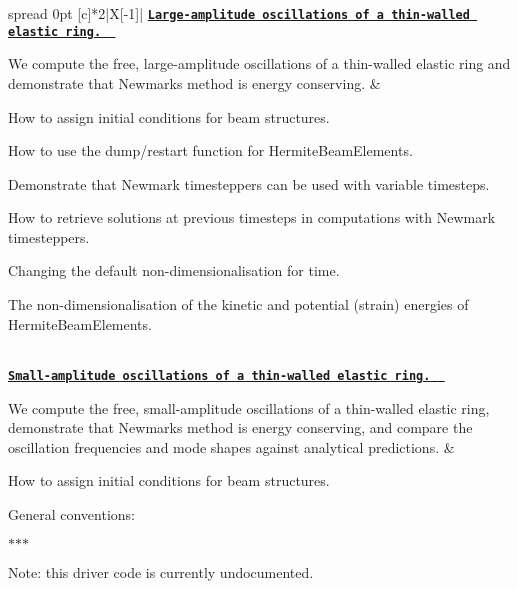 \tabulinesep=1mm
\begin{longtabu} spread 0pt [c]{*{2}{|X[-1]}|}
\hline
\href{../../beam/unsteady_ring/html/index.html}{\tt {\bfseries Large-\/amplitude oscillations of a thin-\/walled elastic ring. } }

We compute the free, large-\/amplitude oscillations of a thin-\/walled elastic ring and demonstrate that Newmark\textquotesingle{}s method is energy conserving.  &
\begin{DoxyItemize}
\item How to assign initial conditions for beam structures.
\item How to use the dump/restart function for {\ttfamily Hermite\+Beam\+Elements}.
\item Demonstrate that {\ttfamily Newmark} timesteppers can be used with variable timesteps.
\item How to retrieve solutions at previous timesteps in computations with {\ttfamily Newmark} timesteppers.
\item Changing the default non-\/dimensionalisation for time.
\item The non-\/dimensionalisation of the kinetic and potential (strain) energies of {\ttfamily Hermite\+Beam\+Elements}. 
\end{DoxyItemize}

\\
\href{../../beam/lin_unsteady_ring/html/index.html}{\tt {\bfseries Small-\/amplitude oscillations of a thin-\/walled elastic ring. } }

We compute the free, small-\/amplitude oscillations of a thin-\/walled elastic ring, demonstrate that Newmark\textquotesingle{}s method is energy conserving, and compare the oscillation frequencies and mode shapes against analytical predictions.  &
\begin{DoxyItemize}
\item How to assign initial conditions for beam structures.
\item General conventions\+:
\begin{DoxyItemize}
\item $\ast$$\ast$$\ast$
\end{DoxyItemize}
\item Note\+: this driver code is currently undocumented.   
\end{DoxyItemize}\\
\end{longtabu}
